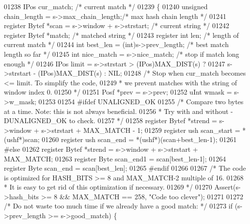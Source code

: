 \begin{DoxyCode}
{01238     IPos cur\_match;                             \textcolor{comment}{/* current match */}
01239 \{
01240     \textcolor{keywordtype}{unsigned} chain\_length = s->max\_chain\_length;\textcolor{comment}{/* max hash chain length */}
01241     \textcolor{keyword}{register} Bytef *scan = s->window + s->strstart; \textcolor{comment}{/* current string */}
01242     \textcolor{keyword}{register} Bytef *match;                      \textcolor{comment}{/* matched string */}
01243     \textcolor{keyword}{register} \textcolor{keywordtype}{int} len;                           \textcolor{comment}{/* length of current match */}
01244     \textcolor{keywordtype}{int} best\_len = (int)s->prev\_length;         \textcolor{comment}{/* best match length so far */}
01245     \textcolor{keywordtype}{int} nice\_match = s->nice\_match;             \textcolor{comment}{/* stop if match long enough */}
01246     IPos limit = s->strstart > (IPos)MAX\_DIST(s) ?
01247         s->strstart - (IPos)MAX\_DIST(s) : NIL;
01248     \textcolor{comment}{/* Stop when cur\_match becomes <= limit. To simplify the code,}
01249 \textcolor{comment}{     * we prevent matches with the string of window index 0.}
01250 \textcolor{comment}{     */}
01251     Posf *prev = s->prev;
01252     uInt wmask = s->w\_mask;
01253 
01254 \textcolor{preprocessor}{#ifdef UNALIGNED\_OK}
01255     \textcolor{comment}{/* Compare two bytes at a time. Note: this is not always beneficial.}
01256 \textcolor{comment}{     * Try with and without -DUNALIGNED\_OK to check.}
01257 \textcolor{comment}{     */}
01258     \textcolor{keyword}{register} Bytef *strend = s->window + s->strstart + MAX\_MATCH - 1;
01259     \textcolor{keyword}{register} ush scan\_start = *(ushf*)scan;
01260     \textcolor{keyword}{register} ush scan\_end   = *(ushf*)(scan+best\_len-1);
01261 \textcolor{preprocessor}{#else}
01262     \textcolor{keyword}{register} Bytef *strend = s->window + s->strstart + MAX\_MATCH;
01263     \textcolor{keyword}{register} Byte scan\_end1  = scan[best\_len-1];
01264     \textcolor{keyword}{register} Byte scan\_end   = scan[best\_len];
01265 \textcolor{preprocessor}{#endif}
01266 
01267     \textcolor{comment}{/* The code is optimized for HASH\_BITS >= 8 and MAX\_MATCH-2 multiple of 16.}
01268 \textcolor{comment}{     * It is easy to get rid of this optimization if necessary.}
01269 \textcolor{comment}{     */}
01270     Assert(s->hash\_bits >= 8 && MAX\_MATCH == 258, \textcolor{stringliteral}{"Code too clever"});
01271 
01272     \textcolor{comment}{/* Do not waste too much time if we already have a good match: */}
01273     \textcolor{keywordflow}{if} (s->prev\_length >= s->good\_match) \{
}
\end{DoxyCode}
